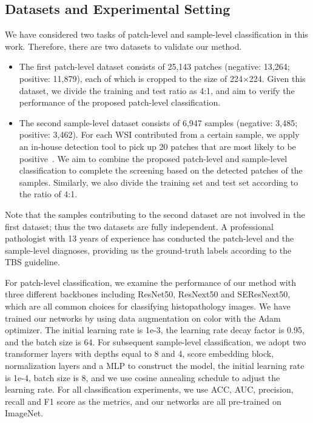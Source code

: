 \subsection{Datasets and Experimental Setting}\label{section-4-1}
We have considered two tasks of patch-level and sample-level classification in this work. 
Therefore, there are two datasets to validate our method. 
\begin{itemize}
    \item 
    The first patch-level dataset consists of 25,143 patches (negative: 13,264; positive: 11,879), each of which is cropped to the size of 224$\times$224. 
    Given this dataset, we divide the training and test ratio as 4:1, and aim to verify the performance of the proposed patch-level classification.
    \item 
    The second sample-level dataset consists of 6,947 samples (negative: 3,485; positive: 3,462). 
    For each WSI contributed from a certain sample, we apply an in-house detection tool to pick up 20 patches that are most likely to be positive~\cite{zhou2021hierarchical}. 
    We aim to combine the proposed patch-level and sample-level classification to complete the screening based on the detected patches of the samples. 
    Similarly, we also divide the training set and test set according to the ratio of 4:1.
\end{itemize}   
  
Note that the samples contributing to the second dataset are not involved in the first dataset; thus the two datasets are fully independent. 
A professional pathologist with 13 years of experience has conducted the patch-level and the sample-level diagnoses, providing us the ground-truth labels according to the TBS guideline. 

For patch-level classification, we examine the performance of our method with three different backbones including ResNet50, ResNext50 and SEResNext50, which are all common choices for classifying histopathology images. We have trained our networks by using data augmentation on color with the Adam optimizer. The initial learning rate is 1e-3, the learning rate decay factor is 0.95, and the batch size is 64.
For subsequent sample-level classification, we adopt two transformer layers with depths equal to 8 and 4, score embedding block, normalization layers and a MLP to construct the model, the initial learning rate is 1e-4, batch size is 8, and we use cosine annealing schedule to adjust the learning rate.
For all classification experiments, we use ACC, AUC, precision, recall and F1 score as the metrics, and our networks are all pre-trained on ImageNet. 




